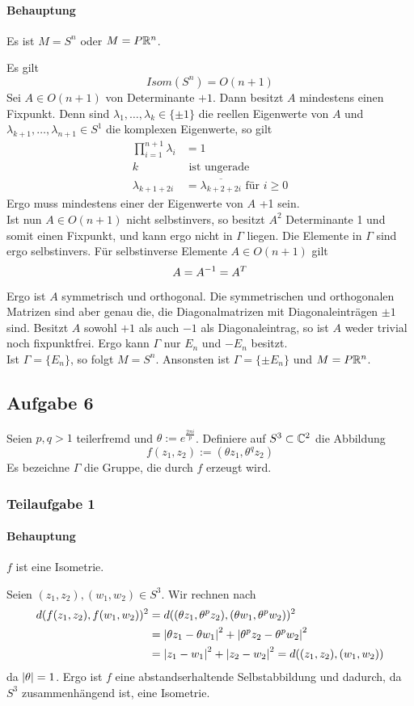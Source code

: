 \documentclass{book}
\begin{document}
\paragraph{Behauptung}
Es ist $M = S^n$ oder $M = P\mathbb{R}^n$.
\begin{Beweis}{}
	Es gilt
	\[ Isom(S^n) = O(n+1) \]
	Sei $A \in O(n+1)$ von Determinante $+1$. Dann besitzt $A$ mindestens einen Fixpunkt. Denn sind $\lambda_1, \ldots, \lambda_k\in \{\pm 1\}$ die reellen Eigenwerte von $A$ und $\lambda_{k+1},\ldots,\lambda_{n+1}\in S^1$ die komplexen Eigenwerte, so gilt
	\begin{align*}
	\prod_{i = 1}^{n+1} \lambda_i & = 1\\
	k &\text{ ist ungerade}\\
	\lambda_{k+1 + 2i} &= \overline{ \lambda_{k+2 + 2i}} \text{ für }i\geq 0
	\end{align*}
	Ergo muss mindestens einer der Eigenwerte von $A$ +1 sein.\\
	Ist nun $A \in O(n+1)$ nicht selbstinvers, so besitzt $A^2$ Determinante 1 und somit einen Fixpunkt, und kann ergo nicht in $\Gamma$ liegen. Die Elemente in $\Gamma$ sind ergo selbstinvers. Für selbstinverse Elemente $A \in O(n+1)$ gilt
	\[ A = A^{-1} = A^T \]
	Ergo ist $A$ symmetrisch und orthogonal. Die symmetrischen und orthogonalen Matrizen sind aber genau die, die Diagonalmatrizen mit Diagonaleinträgen $\pm 1$ sind. Besitzt $A$ sowohl $+1$ als auch $-1$ als Diagonaleintrag, so ist $A$ weder trivial noch fixpunktfrei. Ergo kann $\Gamma$ nur $E_n$ und $-E_n$ besitzt.\\
	Ist $\Gamma = \{E_n\}$, so folgt $M = S^n$. Ansonsten ist $\Gamma = \{\pm E_n \}$ und $M = P\mathbb{R}^n$. 
\end{Beweis}

\subsection{Aufgabe 6}
Seien $p,q>1$ teilerfremd und $\theta := e^{\frac{2\pi i}{p}}$. Definiere auf $S^3 \subset \mathbb{C}^2$ die Abbildung
\[ f(z_1,z_2) := (\theta z_1, \theta^q z_2) \]
Es bezeichne $\Gamma$ die Gruppe, die durch $f$ erzeugt wird.
\subsubsection{Teilaufgabe 1}
\paragraph{Behauptung} $f$ ist eine Isometrie.
\begin{Beweis}{}
	Seien $(z_1,z_2), (w_1,w_2) \in S^3$. Wir rechnen nach
	\begin{align*}
	d(f(z_1,z_2), f(w_1,w_2))^2 &= d( (\theta z_1, \theta^p z_2) , (\theta w_1, \theta^p w_2) )^2\\
	&= \left| \theta z_1 - \theta w_1 \right|^2 + \left|\theta^p z_2 - \theta^p w_2 \right|^2 \\
	&= \left|z_1 - w_1\right|^2 + \left|z_2 - w_2\right|^2 = d((z_1,z_2), (w_1, w_2))
	\end{align*}
	da $\left|\theta\right| = 1$. Ergo ist $f$ eine abstandserhaltende Selbstabbildung und dadurch, da $S^3$ zusammenhängend ist, eine Isometrie.
\end{Beweis}
\end{document}
